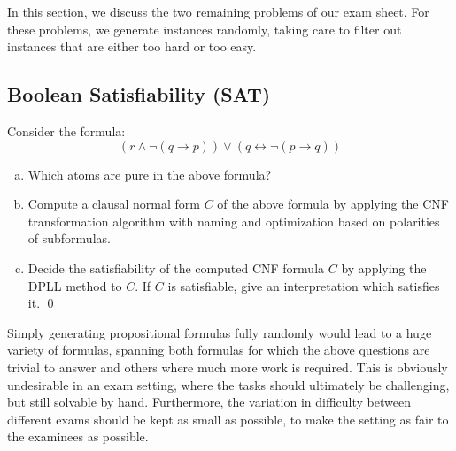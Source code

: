 In this section, we discuss the two remaining problems of our exam sheet.
For these problems, we generate instances randomly,
taking care to filter out instances that are either too hard or too easy.

\subsection{Boolean Satisfiability (SAT)}

\begin{mdframed}
    \begin{example}
        Consider the formula:
        \[
            ( r \land \lnot ( q \rightarrow p ) ) \lor ( q \leftrightarrow \lnot ( p \rightarrow q ) )
        \]
        \begin{enumerate}[(a)]
            \item
                Which atoms are pure in the above formula?
            \item\label{subtask:sat-cnf}
                Compute a clausal normal form $C$ of the above formula by
                applying the CNF transformation algorithm with naming and
                optimization based on polarities of subformulas.
            \item
                Decide the satisfiability of the computed CNF formula $C$
                by applying the DPLL method to $C$. If $C$ is
                satisfiable, give an interpretation which
                satisfies it.
                \qed
        \end{enumerate}
    \end{example}
\end{mdframed}


Simply generating propositional formulas fully randomly would lead
to a huge variety of formulas,
spanning both formulas for which the above questions are trivial to answer
and others where much more work is required.
This is obviously undesirable in an exam setting,
where the tasks should ultimately be challenging, but still solvable by hand.
Furthermore,
the variation in difficulty between different exams should be kept as small as possible,
to make the setting as fair to the examinees as possible.

